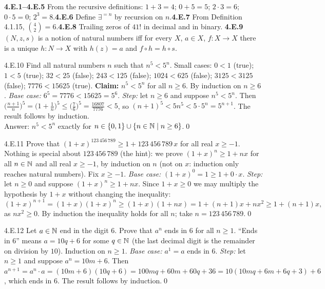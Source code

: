 
\begin{trybox}[{4.E.1--4.E.9 \fO}]
\textbf{4.E.1--4.E.5} From the recursive definitions: $1+3=4$; $0+5=5$; $2\cdot3=6$; $0\cdot5=0$; $2^3=8$.\quad \textbf{4.E.6} Define $\exists^{=n}$ by recursion on $n$.\quad \textbf{4.E.7} From Definition 4.1.15, $\binom42=6$.\quad \textbf{4.E.8} Trailing zeros of $41!$ in decimal and in binary. \quad \textbf{4.E.9} $(N,z,s)$ is a notion of natural numbers iff for every $X$, $a\in X$, $f:X\to X$ there is a unique $h:N\to X$ with $h(z)=a$ and $f\circ h=h\circ s$.
\end{trybox}

\begin{bookex}[essential]{4.E.10}
Find all natural numbers $n$ such that $n^5<5^n$.
\solution
Small cases: $0<1$ (true); $1<5$ (true); $32<25$ (false); $243<125$ (false); $1024<625$ (false); $3125<3125$ (false); $7776<15625$ (true). \textbf{Claim:} $n^5<5^n$ for all $n\ge6$. By induction on $n\ge6$. \emph{Base case:} $6^5=7776<15625=5^6$. \emph{Step:} let $n\ge6$ and suppose $n^5<5^n$. Then $\big(\frac{n+1}n\big)^5=\big(1+\frac1n\big)^5\le\big(\frac76\big)^5=\frac{16807}{7776}<5$, so $(n+1)^5<5n^5<5\cdot5^n=5^{n+1}$. The result follows by induction.\\
Answer: $n^5<5^n$ exactly for $n\in\{0,1\}\cup\{n\in\mathbb{N}\mid n\ge6\}$.\qed
\end{bookex}

\begin{bookex}[essential]{4.E.11}
Prove that $(1+x)^{123\,456\,789}\ge1+123\,456\,789\,x$ for all real $x\ge-1$.
\solution
Nothing is special about $123\,456\,789$ (the hint): we prove $(1+x)^n\ge1+nx$ for all $n\in\mathbb{N}$ and all real $x\ge-1$, by induction on $n$ (not on $x$: induction only reaches natural numbers). Fix $x\ge-1$. \emph{Base case:} $(1+x)^0=1\ge1+0\cdot x$. \emph{Step:} let $n\ge0$ and suppose $(1+x)^n\ge1+nx$. Since $1+x\ge0$ we may multiply the hypothesis by $1+x$ without changing the inequality:
\[
(1+x)^{n+1}=(1+x)(1+x)^n\ge(1+x)(1+nx)=1+(n+1)x+nx^2\ge1+(n+1)x,
\]
as $nx^2\ge0$. By induction the inequality holds for all $n$; take $n=123\,456\,789$.\qed
\end{bookex}

\begin{bookex}[recommended]{4.E.12}
Let $a\in\mathbb{N}$ end in the digit $6$. Prove that $a^n$ ends in $6$ for all $n\ge1$.
\solution
``Ends in $6$'' means $a=10q+6$ for some $q\in\mathbb{N}$ (the last decimal digit is the remainder on division by $10$). Induction on $n\ge1$. \emph{Base case:} $a^1=a$ ends in $6$. \emph{Step:} let $n\ge1$ and suppose $a^n=10m+6$. Then $a^{n+1}=a^n\cdot a=(10m+6)(10q+6)=100mq+60m+60q+36=10(10mq+6m+6q+3)+6$, which ends in $6$. The result follows by induction.\qed
\end{bookex}

